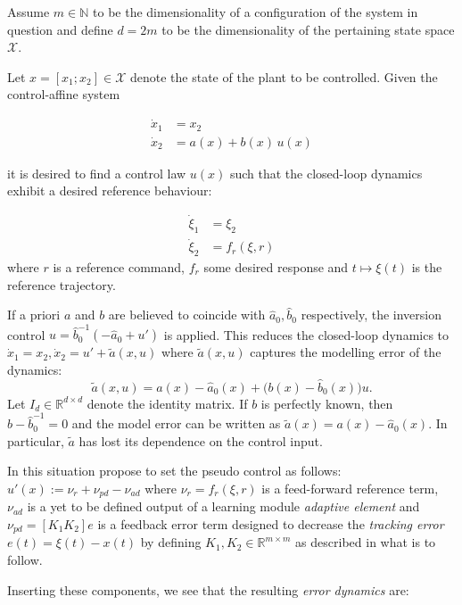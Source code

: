 \documentclass{article} %
\theoremstyle{definition}
\theoremstyle{remark}
\newcommand{\Real}{\mathbb R}
\newcommand{\nat}{\mathbb N}
\newcommand{\statespace}{\ensuremath{ \mathcal X}}
\begin{document}
Assume $m \in \nat$ to be the dimensionality of a configuration of the system in question and define $d = 2m$ to be the dimensionality of the pertaining state space $\statespace$.

Let $x = [x_1;x_2] \in \statespace$ denote the state of the plant to be controlled.
Given the control-affine system 
 
\begin{align}
\dot x_1 &= x_2 \\
\dot x_2 &= a(x) + b(x) \, u(x) \label{eq:secorddynctrlaff}
\end{align}

it is desired to find a control law $u(x)$ such that the closed-loop dynamics exhibit a desired reference behaviour:

\begin{align}
\dot \xi_1 &= \xi_2 \\
\dot \xi_2 &= f_{r}(\xi,r)
\end{align}
where $r$ is a reference command, $f_r$ some desired response and $t \mapsto \xi (t)$ is the reference trajectory.

If a priori $a$ and $b$ are believed to coincide with $\hat a_0, \hat b_0$ respectively, the inversion control 
$u = \hat b_0^{-1} (- \hat a_0 +u')$ is applied. This reduces the closed-loop dynamics to 
$\dot x_1 = x_2, \dot x_2 = u' + \tilde a(x,u) $
where $\tilde a(x,u)$ captures the modelling error of the dynamics: 
\begin{equation}
	\tilde a (x,u ) = a(x) - \hat a_0(x) + \bigl(b(x) - \hat b_0(x)\bigr) u.
\end{equation}
 Let $I_d \in \Real^{d \times d}$ denote the identity matrix.  If $b$ is perfectly known, then $b - \hat b_0^{-1} = 0$ and the model error can be written as $\tilde a (x)= a(x) - \hat a_0(x)$. In particular, $\tilde a$ has lost its dependence on the control input. 



In this situation \cite{Chowdhary2013,ChowdharyCDC2013} propose to set 
the pseudo control as follows: $u'(x) :=  \nu_{r} + \nu_{pd} - \nu_{ad}$ where $\nu_{r} = f_{r}(\xi,r)$ is a feed-forward reference term,  $\nu_{ad}$ is a yet to be defined output of a learning module \emph{adaptive element} and $\nu_{pd} = [K_1 K_2] e$ is a feedback error term designed to decrease the \textit{tracking error} $e(t) = \xi(t) - x(t)$ by defining $K_1,K_2 \in \Real^{m \times m}$ as described in what is to follow.

Inserting these components, we see that the resulting \textit{error dynamics} are:
\end{document}
